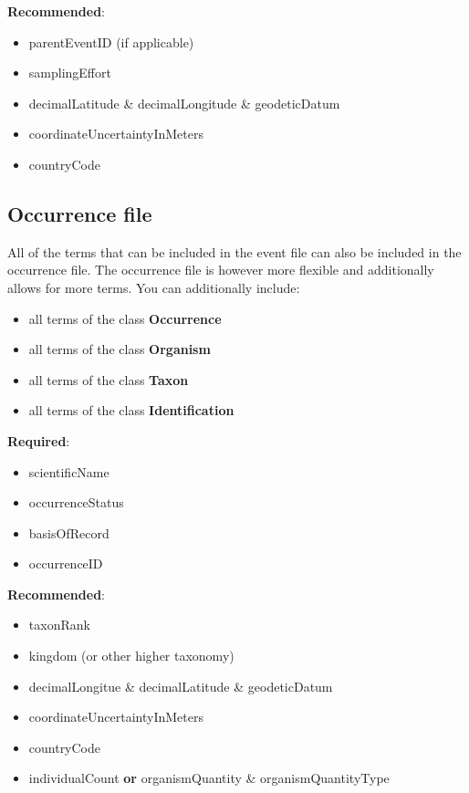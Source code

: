\documentclass[
  oneside]{book}
\providecommand{\tightlist}{%
  \setlength{\itemsep}{0pt}\setlength{\parskip}{0pt}}
\begin{document}
\textbf{Recommended}:

\begin{itemize}
\item
  parentEventID {(if applicable)}
\item
  samplingEffort
\item
  decimalLatitude {\&} decimalLongitude {\&} geodeticDatum
\item
  coordinateUncertaintyInMeters
\item
  countryCode
\end{itemize}

\subsection{Occurrence file}\label{occurrence-file}

All of the terms that can be included in the event file can also be included in the occurrence file. The occurrence file is however more flexible and additionally allows for more terms. You can additionally include:

\begin{itemize}
\tightlist
\item
  all terms of the class \textbf{Occurrence}
\item
  all terms of the class \textbf{Organism}
\item
  all terms of the class \textbf{Taxon}
\item
  all terms of the class \textbf{Identification}
\end{itemize}

\textbf{Required}:

\begin{itemize}
\item
  scientificName
\item
  occurrenceStatus
\item
  basisOfRecord
\item
  occurrenceID
\end{itemize}

\textbf{Recommended}:

\begin{itemize}
\item
  taxonRank
\item
  kingdom {(or other higher taxonomy)}
\item
  decimalLongitue {\&} decimalLatitude {\&} geodeticDatum
\item
  coordinateUncertaintyInMeters
\item
  countryCode
\item
  individualCount {\textbf{or}} organismQuantity {\&} organismQuantityType
\end{itemize}
\end{document}
